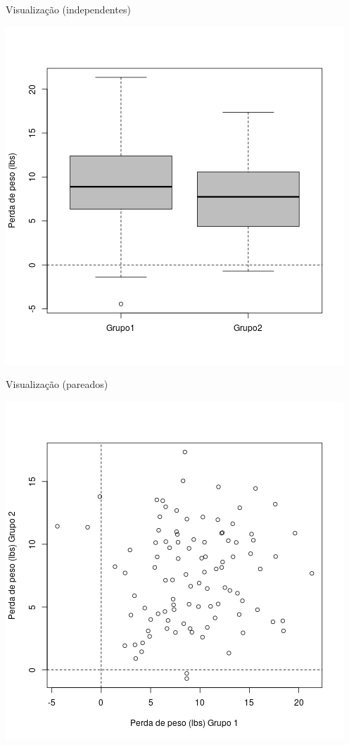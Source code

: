 \documentclass{beamer}
\begin{document}
\begin{frame}{\scriptsize Visualização (independentes)}
  \begin{center}
    \includegraphics[height=\textheight]{Cap23-25/obesidade-independentes}
  \end{center}
\end{frame}

\begin{frame}{\scriptsize Visualização (pareados)}
  \begin{center}
    \includegraphics[height=\textheight]{Cap23-25/obesidade-pareadas}
  \end{center}
\end{frame}
\end{document}

